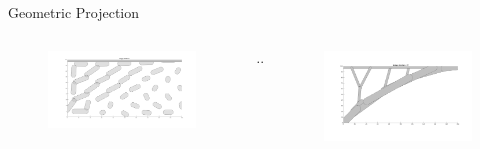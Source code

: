 \documentclass{beamer}
\begin{document}
\begin{frame}{Geometric Projection}
    \begin{columns}[onlytextwidth]
        \begin{column}{0.4\textwidth}
            \centering
            \begin{figure}[!ht]
                \centering
                \includegraphics[width=1.5\textwidth, angle=90, origin=c]{./Images/initial design.png}
                \label{fig:GTO_Initial}
            \end{figure}
        \end{column}
        \begin{column}{0.2\textwidth}
            \centering
            $\cdots\Longrightarrow$
        \end{column}
        \begin{column}{0.4\textwidth}
            \centering
            \begin{figure}[!ht]
                \centering
                \includegraphics[width=1.5\textwidth, angle=90, origin=c]{./Images/final design.png}
                \label{fig:GTO_final}
            \end{figure}
        \end{column}
    \end{columns}

\end{frame}
\end{document}
